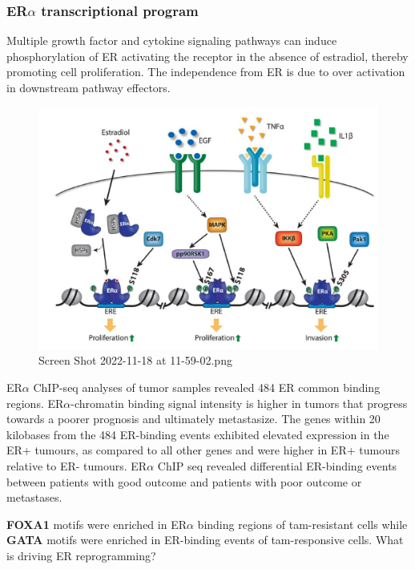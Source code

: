 \hypertarget{ertranscriptional-program}{%
\subsubsection{\texorpdfstring{ER$\alpha$ transcriptional program}{ERtranscriptional program}}\label{ertranscriptional-program}}

Multiple growth factor and cytokine signaling pathways can induce phosphorylation of ER activating the receptor in the absence of estradiol, thereby promoting cell proliferation. The independence from ER is due to over activation in downstream pathway effectors.

\begin{figure}
\centering
\includegraphics[width=\textwidth]{../_resources/Screen_Shot_2022-11-18_at_11-59-02.png}
\caption{Screen Shot 2022-11-18 at 11-59-02.png}
\end{figure}

ER$\alpha$ ChIP-seq analyses of tumor samples revealed 484 ER common binding regions. ER$\alpha$-chromatin binding signal intensity is higher in tumors that progress towards a poorer prognosis and ultimately metastasize. The genes within 20 kilobases from the 484 ER-binding events exhibited elevated expression in the ER+ tumours, as compared to all other genes and were higher in ER+ tumours relative to ER- tumours. ER$\alpha$ ChIP seq revealed differential ER-binding events between patients with good outcome and patients with poor outcome or metastases.

\textbf{FOXA1} motifs were enriched in ER$\alpha$ binding regions of tam-resistant cells while \textbf{GATA} motifs were enriched in ER-binding events of tam-responsive cells. What is driving ER reprogramming?

